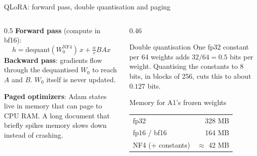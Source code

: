 \documentclass[aspectratio=169,11pt]{beamer}
\begin{document}
\begin{frame}{QLoRA: forward pass, double quantisation and paging}
  \begin{columns}[T]
    \begin{column}{0.5\textwidth}
      \small
      \textbf{Forward pass} (compute in bf16):
      \[
        h=\text{dequant}(W_0^{\text{NF4}})\,x+\tfrac{\alpha}{r}BAx
      \]
      \textbf{Backward pass}: gradients flow through the dequantised $W_0$ to reach $A$ and $B$. $W_0$ itself is never updated.
      \vspace{2mm}

      \textbf{Paged optimizers}: Adam states live in memory that can page to CPU RAM. A long document that briefly spikes memory slows down instead of crashing.
    \end{column}
    \begin{column}{0.46\textwidth}
      \begin{block}{Double quantisation}
        \small
        One fp32 constant per 64 weights adds $32/64=0.5$ bits per weight.
        Quantising the constants to 8 bits, in blocks of 256, cuts this to about $0.127$ bits.
      \end{block}
      \begin{exampleblock}{Memory for A1's frozen weights}
        \small
        \begin{tabular}{@{}lr@{}}
          fp32 & 328 MB\\
          fp16 / bf16 & 164 MB\\
          NF4 (+ constants) & $\approx$ 42 MB\\
        \end{tabular}
      \end{exampleblock}
    \end{column}
  \end{columns}
\end{frame}
\end{document}
